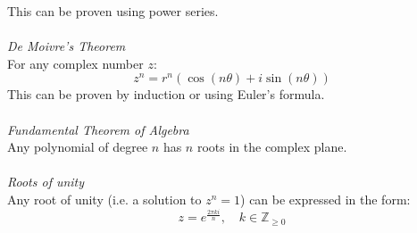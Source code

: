 \documentclass{scrartcl}
\newcommand{\Z}{\mathbb{Z}}
\begin{document}
This can be proven using power series.
\\\\
\textit{De Moivre's Theorem}
\\
For any complex number $ z $:
\begin{equation}
z^{n} = r^{n} (\cos(n \theta) + i \sin(n \theta))
\end{equation}
This can be proven by induction or using Euler's formula.
\\\\
\textit{Fundamental Theorem of Algebra}
\\
Any polynomial of degree $ n $ has $ n $ roots in the complex plane.
\\\\
\textit{Roots of unity}
\\
Any root of unity (i.e. a solution to $ z^{n} = 1 $) can be expressed in the form:
\begin{equation}
z = e^{\frac{2 \pi k i}{n}}, \quad k \in \Z_{\geq 0}
\end{equation}
\end{document}
